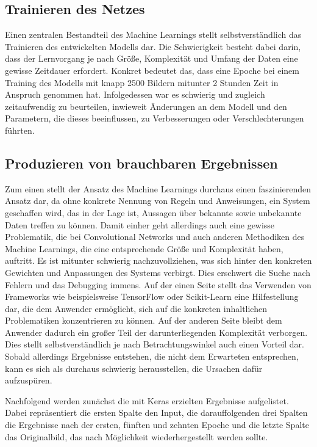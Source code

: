 \subsection{Trainieren des Netzes}

Einen zentralen Bestandteil des Machine Learnings stellt selbstverständlich das Trainieren des entwickelten Modells dar.
Die Schwierigkeit besteht dabei darin, dass der Lernvorgang je nach Größe, Komplexität und Umfang der Daten eine gewisse
Zeitdauer erfordert. Konkret bedeutet das, dass eine Epoche bei einem Training des Modells mit knapp 2500 Bildern mitunter
2 Stunden Zeit in Anspruch genommen hat. Infolgedessen war es schwierig und zugleich zeitaufwendig zu beurteilen,
inwieweit Änderungen an dem Modell und den Parametern, die dieses beeinflussen, zu Verbesserungen oder Verschlechterungen
führten.

\subsection{Produzieren von brauchbaren Ergebnissen}

Zum einen stellt der Ansatz des Machine Learnings durchaus einen faszinierenden Ansatz dar, da ohne konkrete Nennung von
Regeln und Anweisungen, ein System geschaffen wird, das in der Lage ist, Aussagen über bekannte sowie unbekannte Daten
treffen zu können. Damit einher geht allerdings auch eine gewisse Problematik, die bei Convolutional Networks und auch
anderen Methodiken des Machine Learnings, die eine entsprechende Größe und Komplexität haben, auftritt. Es ist mitunter
schwierig nachzuvollziehen, was sich hinter den konkreten Gewichten und Anpassungen des Systems verbirgt. Dies erschwert
die Suche nach Fehlern und das Debugging immens.
Auf der einen Seite stellt das Verwenden von Frameworks wie beispielsweise TensorFlow oder Scikit-Learn eine Hilfestellung
dar, die dem Anwender ermöglicht, sich auf die konkreten inhaltlichen Problematiken konzentrieren zu können. Auf der
anderen Seite bleibt dem Anwender dadurch ein großer Teil der darunterliegenden Komplexität verborgen. Dies stellt
selbstverständlich je nach Betrachtungswinkel auch einen Vorteil dar. Sobald allerdings Ergebnisse entstehen, die nicht
dem Erwarteten entsprechen, kann es sich als durchaus schwierig herausstellen, die Ursachen dafür aufzuspüren.

Nachfolgend werden zunächst die mit Keras erzielten Ergebnisse aufgelistet. Dabei repräsentiert die ersten Spalte den Input,
die darauffolgenden drei Spalten die Ergebnisse nach der ersten, fünften und zehnten Epoche und die letzte Spalte das
Originalbild, das nach Möglichkeit wiederhergestellt werden sollte.






